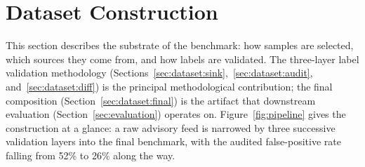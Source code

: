 \section{Dataset Construction}
\label{sec:dataset}

This section describes the substrate of the benchmark: how samples are
selected, which sources they come from, and how labels are validated.
The three-layer label validation methodology
(Sections~\ref{sec:dataset:sink},~\ref{sec:dataset:audit},
and~\ref{sec:dataset:diff}) is the principal methodological
contribution; the final composition (Section~\ref{sec:dataset:final})
is the artifact that downstream evaluation (Section~\ref{sec:evaluation})
operates on. Figure~\ref{fig:pipeline} gives the construction at a
glance: a raw advisory feed is narrowed by three successive validation
layers into the final benchmark, with the audited false-positive rate
falling from 52\% to 26\% along the way.

